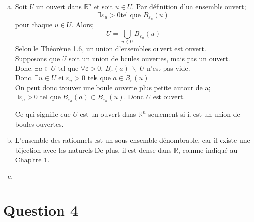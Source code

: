 \documentclass[letterpaper,12pt,oneside,final]{book}
\begin{document}
\begin{enumerate}[a)]

\item %
Soit $U$ un ouvert dans $\mathbb{R}^n$ et soit $u \in U$. Par définition d'un ensemble ouvert;
\[
\exists \varepsilon_u > 0 \text{tel que } B_{\varepsilon_u}(u)
\]
pour chaque $u \in U$. Alors;
\[
U = \bigcup_{u\in U} B_{\varepsilon_u}(u)
\]
Selon le Théorème 1.6, un union d'ensembles ouvert est ouvert.\\
Supposons que $U$ soit un union de boules ouvertes, mais pas un ouvert.\\
Donc, $\exists a \in U$ tel que $\forall \varepsilon > 0$, $B_{\varepsilon}(a)\; \backslash\; U $ n'est pas vide.\\
Donc, $\exists u \in U$ et $\varepsilon_u > 0$ tels que $a \in B_{\varepsilon}(u)$\\
On peut donc trouver une boule ouverte plus petite autour de a;\\
$\exists \varepsilon_a > 0$ tel que $B_{\varepsilon_a}(a) \subset B_{\varepsilon_u}(u)$.
Donc $U$ est ouvert.

Ce qui signifie que $U$ est un ouvert dans $\mathbb{R}^n$ seulement si il est un union de boules ouvertes.


\item %

L'ensemble des rationnels est un sous ensemble dénombrable, car il existe une bijection avec les naturels
De plus, il est dense dans $\mathbb{R}$, comme indiqué au Chapitre 1.

\item 

\end{enumerate}


\newpage
\section*{Question 4}
\end{document}
